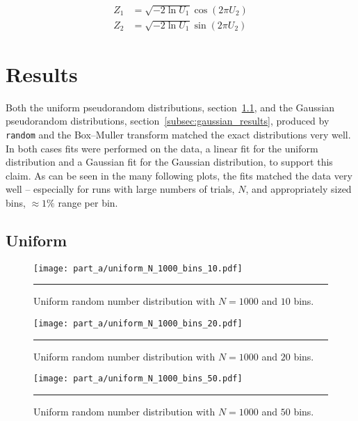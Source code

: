 \documentclass[notitlepage,aps,prd,nofootinbib]{revtex4-1}
\begin{document}
\begin{equation} \label{eq:Zs}
\begin{aligned}
Z_{1} &= \sqrt{-2\ln U_{1}} \cos\left(2\pi U_{2}\right) \\
Z_{2} &= \sqrt{-2\ln U_{1}} \sin\left(2\pi U_{2}\right)
\end{aligned}
\end{equation}

\section{Results}
\label{sec:results}
Both the uniform pseudorandom distributions, section~\ref{subsec:uniform_results}, and the Gaussian pseudorandom distributions, section~\ref{subsec:gaussian_results}, produced by \texttt{random} and the Box--Muller transform matched the exact distributions very well. In both cases fits were performed on the data, a linear fit for the uniform distribution and a Gaussian fit for the Gaussian distribution, to support this claim. As can be seen in the many following plots, the fits matched the data very well -- especially for runs with large numbers of trials, $N$, and appropriately sized bins, $\approx1\%$ range per bin.

\clearpage
\subsection{Uniform}
\label{subsec:uniform_results}

\begin{figure}[!htbc]
  \centering
  \texttt{[image: part\_a/uniform\_N\_1000\_bins\_10.pdf]}
	{\par\nobreak\rule[9pt]{35em}{0.5pt}\vspace{-5mm}}
	\caption{Uniform random number distribution with $N = 1000$ and $10$ bins.}
	\label{fig:uniform_N_1000_bins_10}
\end{figure}

\begin{figure}[!htbc]
  \centering
  \texttt{[image: part\_a/uniform\_N\_1000\_bins\_20.pdf]}
	{\par\nobreak\rule[9pt]{35em}{0.5pt}\vspace{-5mm}}
	\caption{Uniform random number distribution with $N = 1000$ and $20$ bins.}
	\label{fig:uniform_N_1000_bins_20}
\end{figure}

\begin{figure}[!htbc]
  \centering
  \texttt{[image: part\_a/uniform\_N\_1000\_bins\_50.pdf]}
	{\par\nobreak\rule[9pt]{35em}{0.5pt}\vspace{-5mm}}
	\caption{Uniform random number distribution with $N = 1000$ and $50$ bins.}
	\label{fig:uniform_N_1000_bins_50}
\end{figure}
\end{document}
